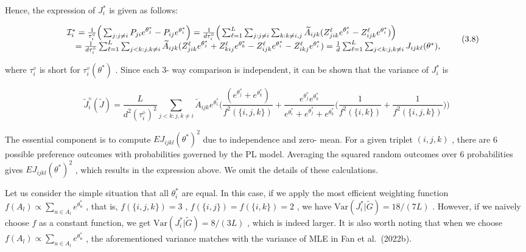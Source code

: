 Hence, the expression of \(J_{i}^{*}\) is given as follows:

\[
\begin{array}{r l} & {\mathcal{I}_{i}^{*} = \frac{1}{\tau_{i}^{\diamond}}\Big(\sum_{j:j\neq i}P_{j i}e^{\theta_{j}^{*}} - P_{i j}e^{\theta_{i}^{*}}\Big) = \frac{1}{d\tau_{i}^{\diamond}}\Big(\sum_{\ell = 1}^{L}\sum_{j:j\neq i}\sum_{k:k\neq i,j}\widetilde{A}_{i j k}(Z_{j i k}^{\ell}e^{\theta_{j}^{*}} - Z_{i j k}^{\ell}e^{\theta_{i}^{*}})\Big)}\\ & {\quad = \frac{1}{d\tau_{i}^{\diamond}}\sum_{\ell = 1}^{L}\sum_{j< k:j,k\neq i}\widetilde{A}_{i j k}(Z_{j i k}^{\ell}e^{\theta_{j}^{*}} + Z_{k i j}^{\ell}e^{\theta_{k}^{*}} - Z_{i j k}^{\ell}e^{\theta_{i}^{*}} - Z_{i k j}^{\ell}e^{\theta_{i}^{*}}) = \frac{1}{d}\sum_{\ell = 1}^{L}\sum_{j< k:j,k\neq i}J_{i j k\ell}(\theta^{*}),} \end{array} \tag{3.8}
\]

where \(\tau_{i}^{\diamond}\) is short for
\(\tau_{i}^{\diamond}(\theta^{*})\) . Since each 3- way comparison is
independent, it can be shown that the variance of \(J_{i}^{*}\) is

\[
\widetilde{J}_{i}^{\diamond}(\widetilde{J}) = \frac{L}{d^{2}(\tau_{i}^{\diamond})^{2}}\sum_{j< k:j,k\neq i}\widetilde{A}_{ijk}e^{\theta_{i}^{*}}\Big(\frac{(e^{\theta_{j}^{*}} + e^{\theta_{k}^{*}})}{f^{2}(\{i,j,k\})} +\frac{e^{\theta_{j}^{*}}e^{\theta_{k}^{*}}}{e^{\theta_{i}^{*}} + e^{\theta_{j}^{*}} + e^{\theta_{k}^{*}}}\Big(\frac{1}{f^{2}(\{i,k\})} +\frac{1}{f^{2}(\{i,j,k\})}\Big)\Big)
\]

The essential component is to compute \(EJ_{ijkl}(\theta^{*})^{2}\) due
to independence and zero- mean. For a given triplet \((i,j,k)\) , there
are 6 possible preference outcomes with probabilities governed by the PL
model. Averaging the squared random outcomes over 6 probabilities gives
\(EJ_{ijkl}(\theta^{*})^{2}\) , which results in the expression above.
We omit the details of these calculations.

Let us consider the simple situation that all \(\theta_{i}^{*}\) are
equal. In this case, if we apply the most efficient weighting function
\(f(A_{l})\propto \sum_{u\in A_{l}}e^{\theta_{u}^{*}}\) , that is,
\(f(\{i,j,k\}) = 3\) , \(f(\{i,j\}) = f(\{i,k\}) = 2\) , we have
\(\mathrm{Var}(J_i^* |\widetilde{G}) = 18 / (7L)\) . However, if we
naively choose \(f\) as a constant function, we get
\(\mathrm{Var}(J_i^* |\widetilde{G}) = 8 / (3L)\) , which is indeed
larger. It is also worth noting that when we choose
\(f(A_{l})\propto \sum_{u\in A_{l}}e^{\theta_{u}^{*}}\) , the
aforementioned variance matches with the variance of MLE in Fan et
al.~(2022b).

